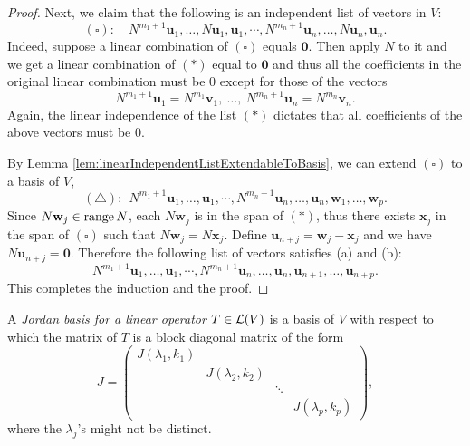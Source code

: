 \begin{proof}
  Next, we claim that
  the following is an independent list of vectors in $V$:
  \begin{displaymath}
    (\square):\quad N^{m_1+1}\mathbf{u}_1, \ldots, N\mathbf{u}_1, \mathbf{u}_1,
    \cdots, N^{m_n+1}\mathbf{u}_n, \ldots, N\mathbf{u}_n, \mathbf{u}_n.
  \end{displaymath}
  Indeed, suppose a linear combination of $(\square)$ equals
  $\mathbf{0}$.
  Then apply $N$ to it and we get a linear combination of $(*)$
  equal to $\mathbf{0}$ and thus all the coefficients
  in the original linear combination must be 0 except for
  those of the vectors
  \begin{displaymath}
    N^{m_1+1}\mathbf{u}_1=N^{m_1}\mathbf{v}_1,\
    \ldots,\  N^{m_n+1}\mathbf{u}_n=N^{m_n}\mathbf{v}_n.
  \end{displaymath}
  Again, the linear independence of the list $(*)$ dictates
  that all coefficients of the above vectors must be 0.

  By Lemma \ref{lem:linearIndependentListExtendableToBasis},
  we can extend $(\square)$ to a basis of $V$, 
  \begin{displaymath}
    (\triangle):\ \ N^{m_1+1}\mathbf{u}_1, \ldots, \mathbf{u}_1,
    \cdots, N^{m_n+1}\mathbf{u}_n, \ldots, \mathbf{u}_n,
    \mathbf{w}_1, \ldots, \mathbf{w}_p.
  \end{displaymath}
  Since $N \mathbf{w}_j\in \mathrm{range}\,N$,
  each $N\mathbf{w}_j$ is in the span of $(*)$,
  thus there exists $\mathbf{x}_j$ in the span of $(\square)$
  such that \mbox{$N\mathbf{w}_j=N \mathbf{x}_j$}.
%  
  Define $\mathbf{u}_{n+j}=\mathbf{w}_j-\mathbf{x}_j$
  and we have $N \mathbf{u}_{n+j} = \mathbf{0}$.
  Therefore the following list of vectors
  satisfies (a) and (b):
  \begin{displaymath}
    N^{m_1+1}\mathbf{u}_1, \ldots, \mathbf{u}_1,
    \cdots, N^{m_n+1}\mathbf{u}_n, \ldots, \mathbf{u}_n,
    \mathbf{u}_{n+1}, \ldots, \mathbf{u}_{n+p}.
  \end{displaymath}
  This completes the induction and the proof.
\end{proof}

\begin{defn}
  \label{def:JordanBasis}
  A \emph{Jordan basis for a linear operator} $T\in {\cal L}(V)$
  is a basis of $V$ with respect to which
  the matrix of $T$ is a block diagonal matrix of the form
  \begin{equation}
    \label{eq:JordanBasis}
    J = 
    \begin{pmatrix}
      J(\lambda_1,k_1) & & & \\
      & J(\lambda_2,k_2) & \\
      & & \ddots & \\
      & & & J(\lambda_p,k_p) 
    \end{pmatrix},
  \end{equation}
  where %
  the $\lambda_j$'s might not be distinct.
\end{defn}

